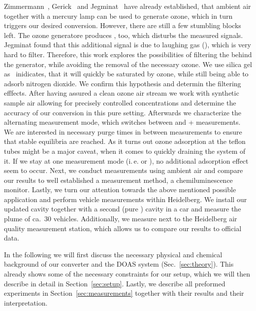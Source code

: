 Zimmermann~\cite{zimmermann}, Gerick~\cite{gerick} and
Jegminat~\cite{bsc} have already established, that ambient air
together with a mercury lamp can be used to generate ozone, which in
turn triggers our desired conversion. However, there are still a few
stumbling blocks left. The ozone generatore produces , too,
which disturbs the measured  signals. Jegminat found that
this additional signal is due to laughing gas (), which is
very hard to filter. Therefore, this work explores the possibilities
of filtering the  behind the generator, while avoiding the
removal of the necessary ozone. We use silica gel
as~\cite{ozone-silica} inidicates, that it will quickly be saturated
by ozone, while still being able to adsorb nitrogen dioxide.  We
confirm this hypothesis and determin the filtering efffects. After
having assured a clean ozone air stream we work with synthetic sample
air allowing for precisely controlled  concentrations and
determine the accuracy of our conversion in this pure 
setting. Afterwards we characterize the alternating measurement mode,
which switches between  and + measurements. We
are interested in necessary purge times in between measurements to
ensure that stable equilibria are reached. As it turns out ozone
adsorption at the teflon tubes might be a major caveat, when it comes
to quickly draining the system of it. If we stay at one measurement
mode (i.\,e.  or ), no additional adsorption effect
seem to occur. Next, we conduct measurements using ambient air and
compare our results to well established a  measurement method,
a chemiluminescence monitor. Lastly, we turn our attention towards the
above mentioned possible application and perform vehicle measurements
within Heidelberg. We install our updated cavity together with a
second (pure ) cavity in a car and measure the plume of ca.~30
vehicles. Additionally, we measure next to the Heidelberg air quality
measurement station, which allows us to compare our results to
official data.

In the following we will first discuss the necessary physical and
chemical background of our converter and the DOAS system
(Sec.~\ref{sec:theory}). This already shows some of the necessary
constraints for our setup, which we will then describe in detail in
Section~\ref{sec:setup}. Lastly, we describe all preformed experiments
in Section~\ref{sec:measurements} together with their results and their
interpretation.

